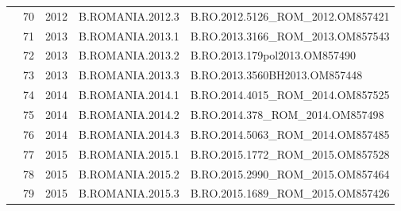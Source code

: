 \begin{table}[htbp]
\begin{tabular}{|cllll|}
\multicolumn{1}{|c|}{}                                   & \multicolumn{1}{l|}{70}          & \multicolumn{1}{l|}{2012}          & \multicolumn{1}{l|}{B.ROMANIA.2012.3}   & B.RO.2012.5126\_ROM\_2012.OM857421 \\ \cline{2-5} 
\multicolumn{1}{|c|}{}                                   & \multicolumn{1}{l|}{71}          & \multicolumn{1}{l|}{2013}          & \multicolumn{1}{l|}{B.ROMANIA.2013.1}   & B.RO.2013.3166\_ROM\_2013.OM857543 \\ \cline{2-5} 
\multicolumn{1}{|c|}{}                                   & \multicolumn{1}{l|}{72}          & \multicolumn{1}{l|}{2013}          & \multicolumn{1}{l|}{B.ROMANIA.2013.2}   & B.RO.2013.179pol2013.OM857490      \\ \cline{2-5} 
\multicolumn{1}{|c|}{}                                   & \multicolumn{1}{l|}{73}          & \multicolumn{1}{l|}{2013}          & \multicolumn{1}{l|}{B.ROMANIA.2013.3}   & B.RO.2013.3560BH2013.OM857448      \\ \cline{2-5} 
\multicolumn{1}{|c|}{}                                   & \multicolumn{1}{l|}{74}          & \multicolumn{1}{l|}{2014}          & \multicolumn{1}{l|}{B.ROMANIA.2014.1}   & B.RO.2014.4015\_ROM\_2014.OM857525 \\ \cline{2-5} 
\multicolumn{1}{|c|}{}                                   & \multicolumn{1}{l|}{75}          & \multicolumn{1}{l|}{2014}          & \multicolumn{1}{l|}{B.ROMANIA.2014.2}   & B.RO.2014.378\_ROM\_2014.OM857498  \\ \cline{2-5} 
\multicolumn{1}{|c|}{}                                   & \multicolumn{1}{l|}{76}          & \multicolumn{1}{l|}{2014}          & \multicolumn{1}{l|}{B.ROMANIA.2014.3}   & B.RO.2014.5063\_ROM\_2014.OM857485 \\ \cline{2-5} 
\multicolumn{1}{|c|}{}                                   & \multicolumn{1}{l|}{77}          & \multicolumn{1}{l|}{2015}          & \multicolumn{1}{l|}{B.ROMANIA.2015.1}   & B.RO.2015.1772\_ROM\_2015.OM857528 \\ \cline{2-5} 
\multicolumn{1}{|c|}{}                                   & \multicolumn{1}{l|}{78}          & \multicolumn{1}{l|}{2015}          & \multicolumn{1}{l|}{B.ROMANIA.2015.2}   & B.RO.2015.2990\_ROM\_2015.OM857464 \\ \cline{2-5} 
\multicolumn{1}{|c|}{}                                   & \multicolumn{1}{l|}{79}          & \multicolumn{1}{l|}{2015}          & \multicolumn{1}{l|}{B.ROMANIA.2015.3}   & B.RO.2015.1689\_ROM\_2015.OM857426 \\ \hline
\end{tabular}
\end{table}


